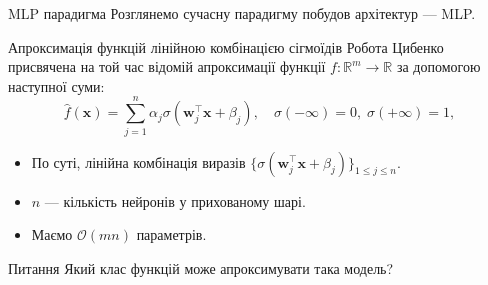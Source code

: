 \documentclass{zkdl-presentation-template}
\begin{document}
        \begin{frame}{MLP парадигма}
        Розглянемо сучасну парадигму побудов архітектур --- MLP.
        \begin{block}{Апроксимація функцій лінійною комбінацією сігмоїдів}
            Робота Цибенко \cite{cybenko} присвячена на той час відомій апроксимації функції $f:
            \mathbb{R}^m \to \mathbb{R}$ за допомогою наступної суми:
            \begin{equation*}\label{eq:cybenko-g}
                \hat{f}(\boldsymbol{x}) = \sum_{j=1}^n \alpha_j \sigma(\boldsymbol{w}_j^{\top}\boldsymbol{x} + \beta_j), \quad \sigma(-\infty) = 0,\; \sigma(+\infty) = 1,
            \end{equation*}
            \begin{itemize}
                \item По суті, лінійна комбінація виразів $\{\sigma(\boldsymbol{w}_j^{\top}\boldsymbol{x} + \beta_j)\}_{1 \leq j \leq n}$.
                \item $n$ --- кількість нейронів у прихованому шарі.
                \item Маємо $\mathcal{O}(mn)$ параметрів.
            \end{itemize}
            
        \end{block}

        \begin{alertblock}{Питання}
            Який клас функцій може апроксимувати така модель?
        \end{alertblock}
    \end{frame}
\end{document}
